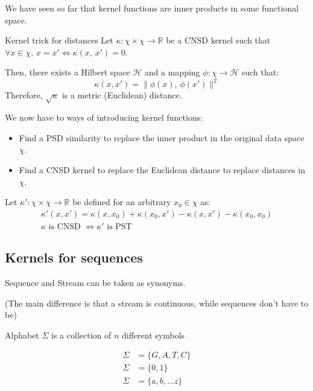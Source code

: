 We have seen so far that kernel functions are inner products in
some functional space.

\begin{theorem}{Kernel trick for distances}{}
	Let $\kappa : \chi \times \chi \to \mathbb R$ be a CNSD kernel
	such that $\forall x \in \chi,\, x = x' \iff \kappa(x,\,x') = 0$.

	Then, there exists a Hilbert space $\mathcal H$ and a mapping
	$\phi : \chi \to \mathcal H$ such that:
	\begin{equation*}
		\kappa(x, x') = \lVert \phi(x),\, \phi(x') \rVert^2
	\end{equation*}
	Therefore, $\sqrt{\kappa}$ is a metric (Euclidean) distance.
\end{theorem}

\begin{recap}{}{}
	We now have to ways of introducing kernel functions:
	\begin{itemize}
		\item Find a PSD similarity to replace the inner product in the
		      original data space $\chi$.
		\item Find a CNSD kernel to replace the Euclidean distance to
		      replace distances in $\chi$.
	\end{itemize}
\end{recap}

\begin{theorem}{}{}
	Let $\kappa' : \chi \times \chi \to \mathbb R$ be defined
	for an arbitrary $x_0 \in \chi$ as:
	\begin{align*}
		\kappa'(x, x') = \kappa(x, x_0) + \kappa(x_0, x') - \kappa(x, x')
		- \kappa(x_0, x_0) \\[1.5em]
		\boxed{
			\kappa\text{ is CNSD }\iff \kappa'\text{ is PST}
		}
	\end{align*}
\end{theorem}

\subsection{Kernels for sequences}

\begin{marker}
	Sequence and Stream can be taken as synonyms.

	(The main difference is that a stream is continuous,
	while sequences don't have to be)
\end{marker}

\begin{definition}{Alphabet $\Sigma$}{} is a collection of $n$
	different symbols

	\tcblower

	\begin{align*}
		\Sigma & = \{G, A, T, C\}     \\
		\Sigma & = \{0, 1\}           \\
		\Sigma & = \{a, b, \ldots z\}
	\end{align*}
\end{definition}

